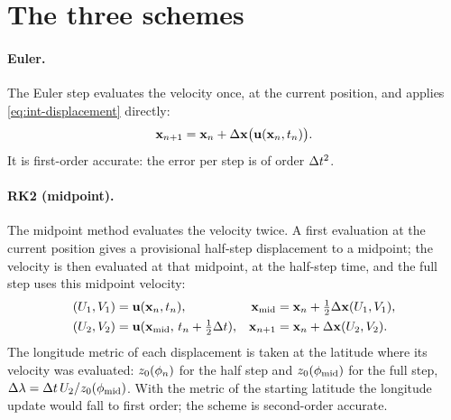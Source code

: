 \section{The three schemes}\label{sec:int-schemes}

\paragraph{Euler.} The Euler step evaluates the velocity once, at the current position,
and applies \cref{eq:int-displacement} directly:
\begin{equation}\label{eq:euler}
  \mathbf{x}_{n+1} = \mathbf{x}_n + \Delta\mathbf{x}\bigl(\mathbf{u}(\mathbf{x}_n,t_n)\bigr).
\end{equation}
It is first-order accurate: the error per step is of order $\Delta t^2$.

\paragraph{RK2 (midpoint).} The midpoint method evaluates the velocity twice. A first
evaluation at the current position gives a provisional half-step displacement to a
midpoint; the velocity is then evaluated at that midpoint, at the half-step time, and
the full step uses this midpoint velocity:
\begin{align}\label{eq:rk2}
  (U_1,V_1) &= \mathbf{u}(\mathbf{x}_n,t_n), &
  \mathbf{x}_{\text{mid}} &= \mathbf{x}_n + \tfrac{1}{2}\Delta\mathbf{x}(U_1,V_1), \notag\\
  (U_2,V_2) &= \mathbf{u}(\mathbf{x}_{\text{mid}},\,t_n+\tfrac{1}{2}\Delta t), &
  \mathbf{x}_{n+1} &= \mathbf{x}_n + \Delta\mathbf{x}(U_2,V_2).
\end{align}
The longitude metric of each displacement is taken at the latitude where its velocity was evaluated:
$z_{0}(\phi_n)$ for the half step and $z_{0}(\phi_{\text{mid}})$ for the full step,
$\Delta\lambda=\Delta t\,U_2/z_{0}(\phi_{\text{mid}})$. With the metric of the starting latitude the
longitude update would fall to first order; the scheme is second-order accurate.

